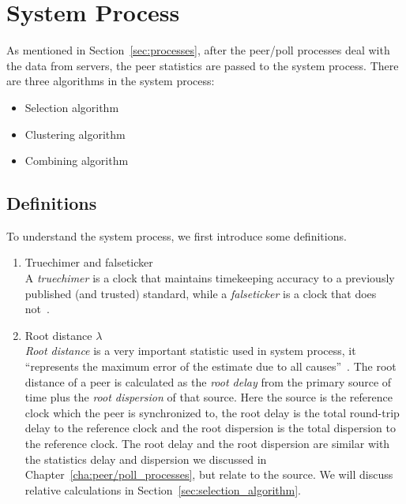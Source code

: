 

\chapter{System Process}
\label{cha:system_process}

As mentioned in Section~\ref{sec:processes}, after the peer/poll processes deal
with the data from servers, the peer statistics are passed to the system
process.  There are three algorithms in the system process:
\begin{itemize}
    \item Selection algorithm
    \item Clustering algorithm
    \item Combining algorithm
\end{itemize}

\section{Definitions}%
\label{sec:system_concepts}
To understand the system process, we first introduce some definitions.

\begin{enumerate}
    \item Truechimer and falseticker\\
        A \emph{truechimer} is a clock that maintains timekeeping accuracy to a
        previously published (and trusted) standard, while a \emph{falseticker}
        is a clock that does not~\cite{redbook}.
    \item Root distance $\lambda$\\
        \emph{Root distance} is a very important statistic used in system
        process, it ``represents the maximum error of the estimate due to all
        causes''~\cite{performance_metrics}. The root distance of a peer is
        calculated as the \emph{root delay} from the primary source of time
        plus the \emph{root dispersion} of that source. Here the source is the
        reference clock which the peer is synchronized to, the root delay is
        the total round-trip delay to the reference clock and the root
        dispersion is the total dispersion to the reference clock. The root
        delay and the root dispersion are similar with the statistics delay and
        dispersion we discussed in Chapter~\ref{cha:peer/poll_processes}, but
        relate to the source. We will discuss relative calculations in
        Section~\ref{sec:selection_algorithm}.
\end{enumerate}

